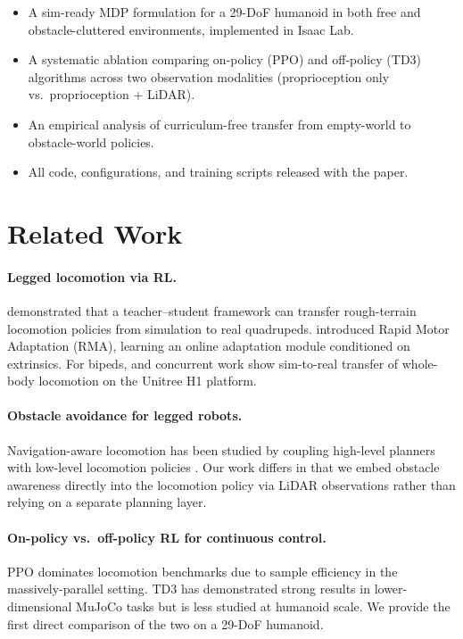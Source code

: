 \documentclass{article}
\begin{document}
\begin{itemize}
  \item A sim-ready MDP formulation for a 29-DoF humanoid in both free and
        obstacle-cluttered environments, implemented in Isaac Lab.
  \item A systematic ablation comparing on-policy (PPO) and off-policy (TD3)
        algorithms across two observation modalities (proprioception only vs.\
        proprioception + LiDAR).
  \item An empirical analysis of curriculum-free transfer from empty-world to
        obstacle-world policies.
  \item All code, configurations, and training scripts released with the paper.
\end{itemize}

\section{Related Work}

\paragraph{Legged locomotion via RL.}
\citet{lee2020learning} demonstrated that a teacher–student framework can
transfer rough-terrain locomotion policies from simulation to real quadrupeds.
\citet{kumar2021rma} introduced Rapid Motor Adaptation (RMA), learning an
online adaptation module conditioned on extrinsics.
For bipeds, \citet{radosavovic2024humanoid} and concurrent work show
sim-to-real transfer of whole-body locomotion on the Unitree H1 platform.

\paragraph{Obstacle avoidance for legged robots.}
Navigation-aware locomotion has been studied by coupling high-level planners
with low-level locomotion policies
\cite{hoeller2024anymal,zhuang2023robot}.
Our work differs in that we embed obstacle awareness directly into the
locomotion policy via LiDAR observations rather than relying on a separate
planning layer.

\paragraph{On-policy vs.\ off-policy RL for continuous control.}
PPO \cite{schulman2017proximal} dominates locomotion benchmarks due to
sample efficiency in the massively-parallel setting.
TD3 \cite{fujimoto2018addressing} has demonstrated strong results in
lower-dimensional MuJoCo tasks but is less studied at humanoid scale.
We provide the first direct comparison of the two on a 29-DoF humanoid.
\end{document}
